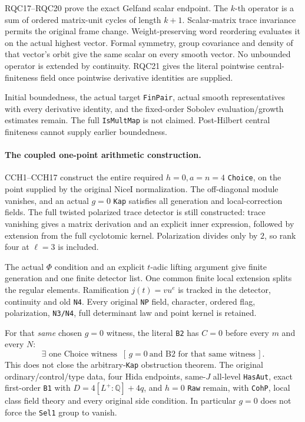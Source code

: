 RQC17--RQC20 prove the exact Gelfand scalar endpoint.
The $k$-th operator is a sum of ordered matrix-unit cycles of
length $k+1$. Scalar-matrix trace invariance permits the original
frame change. Weight-preserving word reordering evaluates it on
the actual highest vector. Formal symmetry, group covariance and
density of that vector's orbit give the same scalar on every
smooth vector. No unbounded operator is extended by continuity.
RQC21 gives the literal pointwise central-finiteness field once
pointwise derivative identities are supplied.

Initial boundedness, the actual target \texttt{FinPair}, actual smooth
representatives with every derivative identity, and the fixed-order
Sobolev evaluation/growth estimates remain. The full
\texttt{IsMultMap} is not claimed. Post-Hilbert central finiteness
cannot supply earlier boundedness.

\paragraph{The coupled one-point arithmetic construction.}
CCH1--CCH17 construct the entire required $h=0,a=n=4$
\texttt{Choice}, on the point supplied by the original NiceI
normalization. The off-diagonal module vanishes, and an actual
$g=0$ \texttt{Kap} satisfies all generation and local-correction fields.
The full twisted polarized trace detector is still constructed:
trace vanishing gives a matrix derivation and an explicit inner
expression, followed by extension from the full cyclotomic kernel.
Polarization divides only by $2$, so rank four at $\ell=3$ is included.

The actual $\Phi$ condition and an explicit $t$-adic lifting argument
give finite generation and one finite detector list. One common
finite local extension splits the regular elements. Ramification
$j(t)=vu^e$ is tracked in the detector, continuity and old \texttt{N4}.
Every original \texttt{NP} field, character, ordered flag,
polarization, \texttt{N3/N4}, full determinant law and point kernel
is retained.

For that \emph{same} chosen $g=0$ witness, the literal \texttt{B2}
has $C=0$ before every $m$ and every $N$:
\[
 \exists\text{ one Choice witness }\
       [\,g=0\ \text{and B2 for that same witness}\,].
\]
This does not close the arbitrary-\texttt{Kap} obstruction theorem.
The original ordinary/control/type data, four Hida endpoints,
same-$J$ all-level \texttt{HasAut}, exact first-order \texttt{B1}
with $D=4[L^+:\mathbb Q]+4q$, and $h=0$ \texttt{Raw} remain,
with \texttt{CohP}, local class field theory and every original
side condition. In particular $g=0$ does not force the
\texttt{Sel1} group to vanish.

